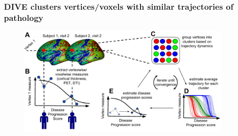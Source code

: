 \begin{frame}[label=current]
\frametitle{DIVE clusters vertices/voxels with similar trajectories of pathology}

\begin{figure}
\centering
\includegraphics[height=5.5cm]{vwdpm_diagram.pdf}
\end{figure}

    
\end{frame}


